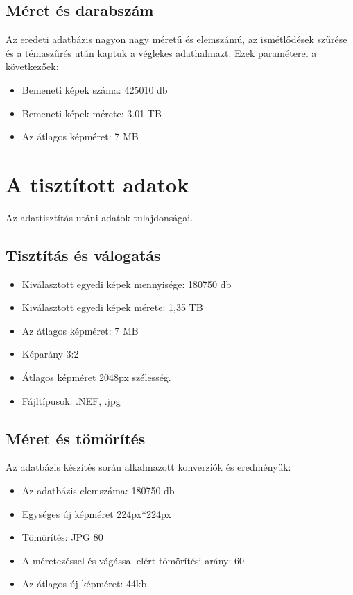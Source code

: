 \documentclass[	
  noindent
]{elteikthesis}[2024/04/26]
\begin{document}
    \subsection{Méret és darabszám}
      Az eredeti adatbázis nagyon nagy méretű és elemszámú, az ismétlődések szűrése és a témaszűrés után kaptuk a véglekes adathalmazt. Ezek paraméterei a következőek:
      \begin{itemize}
        \item Bemeneti képek száma: 425010 db
        \item Bemeneti képek mérete: 3.01 TB
        \item Az átlagos képméret: 7 MB
      \end{itemize}

  \section{A tisztított adatok}
    Az adattisztítás utáni adatok tulajdonságai.

    \subsection{Tisztítás és válogatás}
      \begin{itemize}
        \item Kiválasztott egyedi képek mennyisége: 180750 db
        \item Kiválasztott egyedi képek mérete: 1,35 TB
        \item Az átlagos képméret: 7 MB
        \item Képarány 3:2
        \item Átlagos képméret 2048px szélesség.
        \item Fájltípusok: .NEF, .jpg
      \end{itemize}

    \subsection{Méret és tömörítés}
      Az adatbázis készítés során alkalmazott konverziók és eredményük:
      \begin{itemize}
        \item Az adatbázis elemszáma: 180750 db
        \item Egységes új képméret 224px*224px
        \item Tömörítés: JPG 80
        \item A méretezéssel és vágással elért tömörítési arány: 60%
        \item Az átlagos új képméret: 44kb
      \end{itemize}
\end{document}
